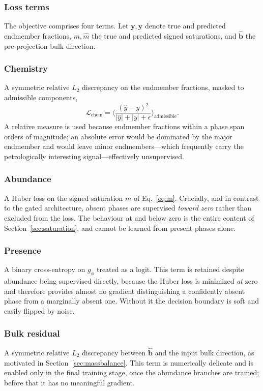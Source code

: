 \subsubsection{Loss terms}

The objective comprises four terms. Let $\mathbf{y},\hat{\mathbf{y}}$ denote true and
predicted endmember fractions, $m,\hat m$ the true and predicted signed saturations,
and $\hat{\mathbf{b}}$ the pre-projection bulk direction.

\subsubsection{Chemistry} A symmetric relative $L_2$ discrepancy on the endmember
fractions, masked to admissible components,
\begin{equation}
  \mathcal{L}_{\mathrm{chem}} =
  \Big\langle \frac{(\hat y - y)^2}{|\hat y| + |y| + \epsilon} \Big\rangle_{\text{admissible}} .
\end{equation}
A relative measure is used because endmember fractions within a phase span orders of
magnitude; an absolute error would be dominated by the major endmember and would
leave minor endmembers---which frequently carry the petrologically interesting
signal---effectively unsupervised.

\subsubsection{Abundance} A Huber loss on the signed saturation $m$ of
Eq.~\eqref{eq:m}. Crucially, and in contrast to the gated architecture, absent phases
are supervised \emph{toward zero} rather than excluded from the loss. The behaviour
at and below zero is the entire content of Section~\ref{sec:saturation}, and cannot
be learned from present phases alone.

\subsubsection{Presence} A binary cross-entropy on $g_\phi$ treated as a logit. This term
is retained despite abundance being supervised directly, because the Huber loss is
minimized \emph{at} zero and therefore provides almost no gradient distinguishing a
confidently absent phase from a marginally absent one. Without it the decision
boundary is soft and easily flipped by noise.

\subsubsection{Bulk residual} A symmetric relative $L_2$ discrepancy between
$\hat{\mathbf{b}}$ and the input bulk direction, as motivated in
Section~\ref{sec:massbalance}. This term is numerically delicate and is enabled only
in the final training stage, once the abundance branches are trained; before that it
has no meaningful gradient.


